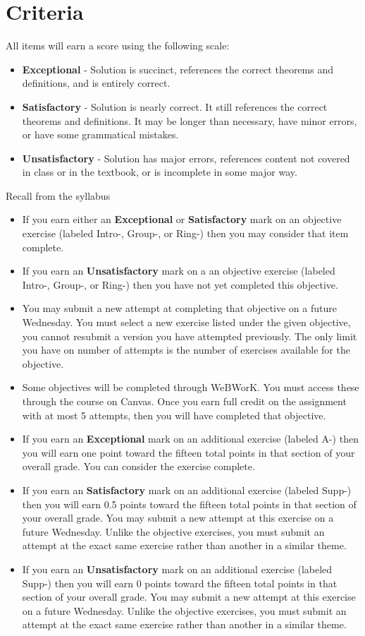 \documentclass[12pt]{article}
\begin{document}
	\section*{Criteria}
		All items will earn a score using the following scale:
		\begin{itemize}
			\item \textbf{Exceptional} - Solution is succinct, references the correct theorems and definitions, and is entirely correct.
			\item \textbf{Satisfactory} - Solution is nearly correct. It still references the correct theorems and definitions. 
					It may be longer than necessary, have minor errors, or have some grammatical mistakes.
			\item \textbf{Unsatisfactory} - Solution has major errors, references content not covered in class or in the textbook, or is incomplete in some major way.
		\end{itemize}
		Recall from the syllabus
		\begin{itemize}
			\item If you earn either an \textbf{Exceptional} or \textbf{Satisfactory} mark on an objective exercise (labeled Intro-, Group-, or Ring-) then you may consider that item complete. 
			\item If you earn an \textbf{Unsatisfactory} mark on a an objective exercise (labeled Intro-, Group-, or Ring-) then you have not yet completed this objective.
			\item You may submit a new attempt at completing that objective on a future Wednesday. You must select a new exercise listed under the given objective, you cannot resubmit a version you have attempted previously.  The only limit you have on number of attempts is the number of exercises available for the objective.
			\item Some objectives will be completed through WeBWorK.  You must access these through the course on Canvas. Once you earn full credit on the assignment with at most 5 attempts, then you will have completed that objective.
			\item If you earn an \textbf{Exceptional} mark on an additional exercise (labeled A-) then you will earn one point toward the fifteen total points in that section of your overall grade. You can consider the exercise complete.
			\item If you earn an \textbf{Satisfactory} mark on an additional exercise (labeled Supp-) then you will earn 0.5 points toward the fifteen total points in that section of your overall grade. You may submit a new attempt at this exercise on a future Wednesday. Unlike the objective exercises, you must submit an attempt at the exact same exercise rather than another in a similar theme.
			\item If you earn an \textbf{Unsatisfactory} mark on an additional exercise (labeled Supp-) then you will earn 0 points toward the fifteen total points in that section of your overall grade. You may submit a new attempt at this exercise on a future Wednesday. Unlike the objective exercises, you must submit an attempt at the exact same exercise rather than another in a similar theme.
		\end{itemize}
	
\end{document}
